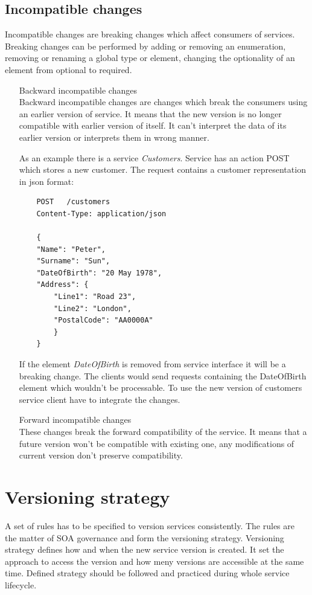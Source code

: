 \subsection{Incompatible changes}
  Incompatible changes are breaking changes which affect consumers of services. Breaking changes can be performed by adding or removing an enumeration, removing or renaming a global type or element, changing the optionality of an element from optional to required.
  \begin{enumerate} 
    \item[Backward incompatible changes]  \hfill \\
    Backward incompatible changes are changes which break the consumers using an earlier version of service. It means that the new version is no longer compatible with earlier version of itself. It can't interpret the data of its earlier version or interprets them in wrong manner.
    
    As an example there is a service \emph{Customers}. Service has an action POST which stores a new customer. The request contains a customer representation in json format: 
    
\begin{lstlisting}
    POST   /customers
    Content-Type: application/json
    
    {
    "Name": "Peter",
    "Surname": "Sun",
    "DateOfBirth": "20 May 1978",
    "Address": {
        "Line1": "Road 23",
        "Line2": "London",
        "PostalCode": "AA0000A"
        }
    }
\end{lstlisting}

If the element \emph{DateOfBirth} is removed from service interface it will be a breaking change. The clients would send requests containing the DateOfBirth element which wouldn't be processable. To use the new version of customers service client have to integrate the changes. 

    \item[Forward incompatible changes] \hfill \\
    These changes break the forward compatibility of the service. It means that a future version won't be compatible with existing one, any modifications of current version don't preserve compatibility.
  \end{enumerate}

\section{Versioning strategy}
\label{sec:version-strategy}
A set of rules has to be specified to version services consistently. The rules are the matter of SOA governance and form the versioning strategy. Versioning strategy defines how and when the new service version is created. It set the approach to access the version and how meny versions are accessible at the same time. Defined strategy should be followed and practiced during whole service lifecycle. 

